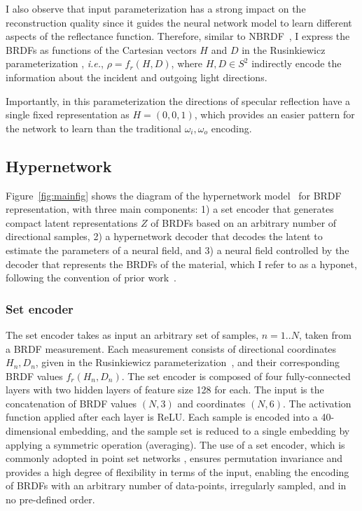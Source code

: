 I also observe that input parameterization has a strong impact on the reconstruction quality since it guides the neural network model to learn different aspects of the reflectance function. Therefore, similar to NBRDF~\cite{sztrajman2021neural}, I express the BRDFs as functions of the Cartesian vectors $H$ and $D$ in the Rusinkiewicz parameterization \cite{rusinkiewicz1998new},
\textit{i.e.}, $\rho=f_r(H, D)$, where $H, D \in S^2$ indirectly encode the information about the incident and outgoing light directions.

Importantly, in this parameterization the directions of specular reflection have a single fixed representation as $H=(0,0,1)$, which provides an easier pattern for the network to learn than the traditional $\omega_i, \omega_o$ encoding.


\subsection{Hypernetwork}
\label{sec:hypernet}

Figure~\ref{fig:mainfig} shows the diagram of the hypernetwork model~\cite{sitzmann2020siren} for BRDF representation, with three main components: 1) a set encoder that generates compact latent representations $Z$ of BRDFs based on an arbitrary number of directional samples, 2) a hypernetwork decoder that decodes the latent to estimate the parameters of a neural field,
and 3) a neural field controlled by the decoder that represents the BRDFs of the material, which I refer to as a hyponet, following the convention of prior work~\cite{sitzmann2020metasdf}.


\subsubsection{Set encoder} %

The set encoder takes as input an arbitrary set of samples, $n=1..N$, taken from a BRDF measurement. Each measurement consists of directional coordinates ${H_n, D_n}$, given in the Rusinkiewicz parameterization~\cite{rusinkiewicz1998new}, and their corresponding BRDF values $f_r(H_n,D_n)$. The set encoder is composed of four fully-connected layers with two hidden layers of feature size 128 for each. The input is the concatenation of BRDF values $(N, 3)$ and coordinates $(N, 6)$. The activation function applied after each layer is ReLU. Each sample is encoded into a 40-dimensional embedding, and the sample set is reduced to a single embedding by applying a symmetric operation (averaging).
The use of a set encoder, which is commonly adopted in point set networks \cite{zaheer2017deepsets}, ensures permutation invariance and provides a high degree of flexibility in terms of the input, enabling the encoding of BRDFs with an arbitrary number of data-points, irregularly sampled, and in no pre-defined order.


